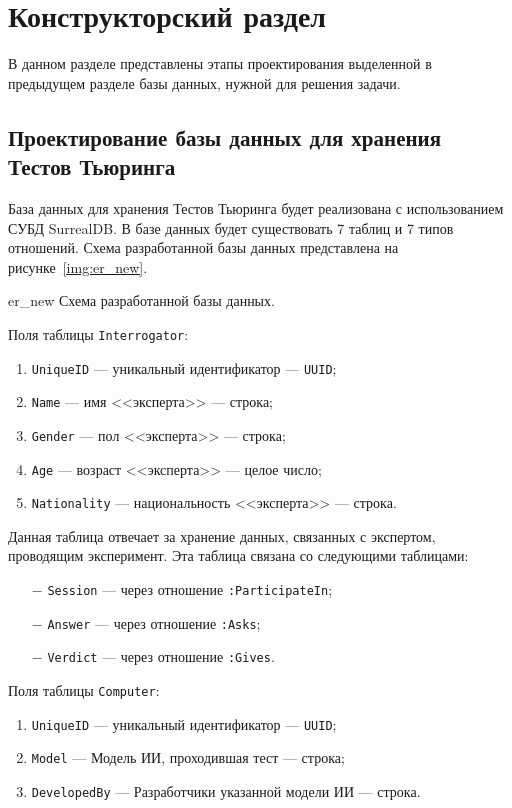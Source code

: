 \section{Конструкторский раздел}
В данном разделе представлены этапы проектирования выделенной в предыдущем разделе базы данных, нужной для решения задачи.

\subsection{Проектирование базы данных для хранения Тестов Тьюринга}  
База данных для хранения Тестов Тьюринга будет реализована с использованием СУБД SurrealDB.
В базе данных будет существовать 7 таблиц и 7 типов отношений. 
Схема разработанной базы данных представлена на рисунке~\ref{img:er_new}.

\img{125mm}
{er_new}
{Схема разработанной базы данных.}

Поля таблицы \texttt{Interrogator}: 
\begin{enumerate}
    \item \texttt{UniqueID} --- уникальный идентификатор --- \texttt{UUID};
    \item \texttt{Name} --- имя <<эксперта>> --- строка;
    \item \texttt{Gender} --- пол <<эксперта>> --- строка;
    \item \texttt{Age} --- возраст <<эксперта>> --- целое число;
    \item \texttt{Nationality} --- национальность <<эксперта>> --- строка.
\end{enumerate}

Данная таблица отвечает за хранение данных, связанных с экспертом, проводящим эксперимент.
Эта таблица связана со следующими таблицами:
\begin{itemize}
    \item[$-$] \texttt{Session} --- через отношение \texttt{:ParticipateIn};
    \item[$-$] \texttt{Answer} --- через отношение \texttt{:Asks};
    \item[$-$] \texttt{Verdict} --- через отношение \texttt{:Gives}.
\end{itemize}

Поля таблицы \texttt{Computer}:
\begin{enumerate}
    \item \texttt{UniqueID} --- уникальный идентификатор --- \texttt{UUID};
    \item \texttt{Model} --- Модель ИИ, проходившая тест --- строка;
    \item \texttt{DevelopedBy} --- Разработчики указанной модели ИИ --- строка.
\end{enumerate}

